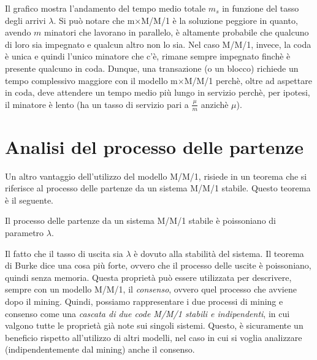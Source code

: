 Il grafico mostra l'andamento del tempo medio totale $m_s$ in funzione del tasso degli arrivi $\lambda$. Si può notare che m$\times$M/M/1 \`e la soluzione peggiore in quanto, avendo $m$ minatori che lavorano in parallelo, \`e altamente probabile che qualcuno di loro sia impegnato e qualcun altro non lo sia. Nel caso M/M/1, invece, la coda \`e unica e quindi l'unico minatore che c'\`e, rimane sempre impegnato finch\`e \`e presente qualcuno in coda. Dunque, una transazione (o un blocco) richiede un tempo complessivo maggiore con il modello m$\times$M/M/1 perch\`e, oltre ad aspettare in coda, deve attendere un tempo medio più lungo in servizio perch\`e, per ipotesi, il minatore \`e lento (ha un tasso di servizio pari a $\frac{\mu}{m}$ anzich\`e $\mu$).

\section{Analisi del processo delle partenze}
Un altro vantaggio dell'utilizzo del modello M/M/1, risiede in un teorema che si riferisce al processo delle partenze da un sistema M/M/1 stabile. Questo teorema \`e il seguente.
\begin{teorema}[di Burke] 
Il processo delle partenze da un sistema M/M/1 stabile \`e poissoniano di parametro $\lambda$.
\end{teorema}
Il fatto che il tasso di uscita sia $\lambda$ \`e dovuto alla stabilità del sistema. Il teorema di Burke dice una cosa più forte, ovvero che il processo delle uscite \`e poissoniano, quindi senza memoria. Questa proprietà può essere utilizzata per descrivere, sempre con un modello M/M/1, il \textit{consenso}, ovvero quel processo che avviene dopo il mining. Quindi, possiamo rappresentare i due processi di mining e consenso come una \textit{cascata di due code M/M/1 stabili e indipendenti}, in cui valgono tutte le proprietà già note sui singoli sistemi. Questo, \`e sicuramente un beneficio rispetto all'utilizzo di altri modelli, nel caso in cui si voglia analizzare (indipendentemente dal mining) anche il consenso.
